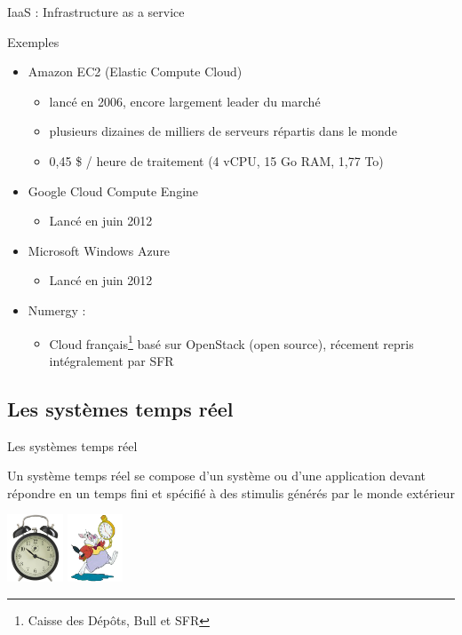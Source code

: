 \begin{frame}{IaaS : Infrastructure as a service}
\begin{exampleblock}{Exemples}
\begin{itemize}
\item Amazon EC2 (Elastic Compute Cloud)
\begin{itemize}
\item lancé en 2006, encore largement leader du marché
\item plusieurs dizaines de milliers de serveurs répartis dans le monde
\item 0,45 \$ / heure de traitement (4 vCPU, 15 Go RAM, 1,77 To)
\end{itemize}

\item Google Cloud Compute Engine
\begin{itemize}
\item Lancé en juin 2012
\end{itemize}

\item Microsoft Windows Azure
\begin{itemize}
\item Lancé en juin 2012
\end{itemize}

\item Numergy : \begin{itemize}
\item Cloud français\footnote{Caisse des Dépôts, Bull et SFR} basé sur OpenStack (open source), récement repris intégralement par SFR
\end{itemize}

\end{itemize}
\end{exampleblock}
\end{frame}


\subsection{Les systèmes temps réel}
\begin{frame}{Les systèmes temps réel}
\begin{definition}
Un système temps réel se compose d'un système ou d'une application
devant répondre en un temps fini et spécifié à des stimulis générés
par le monde extérieur
\end{definition}
\includegraphics[height=2cm]{../illustration/reveil-ikea.jpg}
\includegraphics[height=2cm]{../illustration/lapin-alice-merveilles.png}
\end{frame}


